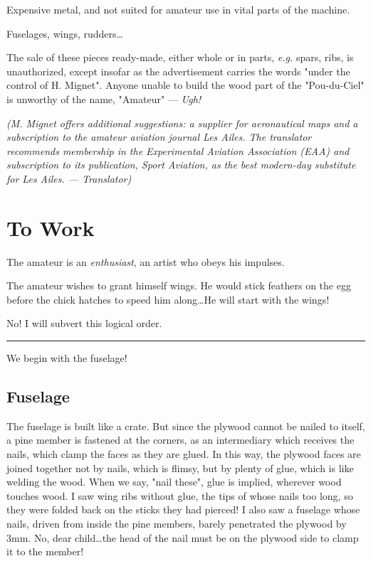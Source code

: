 \documentclass{book}
\newcommand*\sectline{
  \vspace{5pt}
  \begin{center}
    \rule{0.5\linewidth}{\linethickness}
  \end{center}
  \vspace{5pt}
}
\begin{document}
{  Expensive metal, and not suited for amateur use in vital parts of
  the machine.

\item{Fuselages, wings, rudders\ldots}

  The sale of these pieces ready-made, either whole or in parts,
  \textit{e.g.} spars, ribs, is unauthorized, except insofar as the
  advertisement carries the words "under the control of
  H. Mignet". Anyone unable to build the wood part of the
  "Pou-du-Ciel" is unworthy of the name, "Amateur" --- \textit{Ugh!}

\textit{(M. Mignet offers additional suggestions: a supplier for
  aeronautical maps and a subscription to the amateur aviation journal
  \guillemotleft Les Ailes\guillemotright.  The translator recommends membership in the
  Experimental Aviation Association (EAA) and subscription to its
  publication, Sport Aviation, as the best modern-day substitute for
  \guillemotleft Les Ailes\guillemotright. --- Translator)}

}

\chapter{To Work}

The amateur is an \textit{enthusiast}, an artist who obeys his
impulses.

The amateur wishes to grant himself wings. He would stick feathers on
the egg before the chick hatches to speed him along\ldots He will
start with the wings!

No!  I will subvert this logical order.

\sectline

We begin with the fuselage!

\section{Fuselage}

The fuselage is built like a crate. But since the plywood cannot be
nailed to itself, a pine member is fastened at the corners, as an
intermediary which receives the nails, which clamp the faces as they
are glued. In this way, the plywood faces are joined together not by
nails, which is flimsy, but by plenty of glue, which is like welding
the wood. When we say, "nail these", glue is implied, wherever wood
touches wood.  I saw wing ribs without glue, the tips of whose nails
too long, so they were folded back on the sticks they had pierced! I
also saw a fuselage whose nails, driven from inside the pine members,
barely penetrated the plywood by 3mm.  No, dear child\ldots the head
of the nail must be on the plywood side to clamp it to the member!
\end{document}
